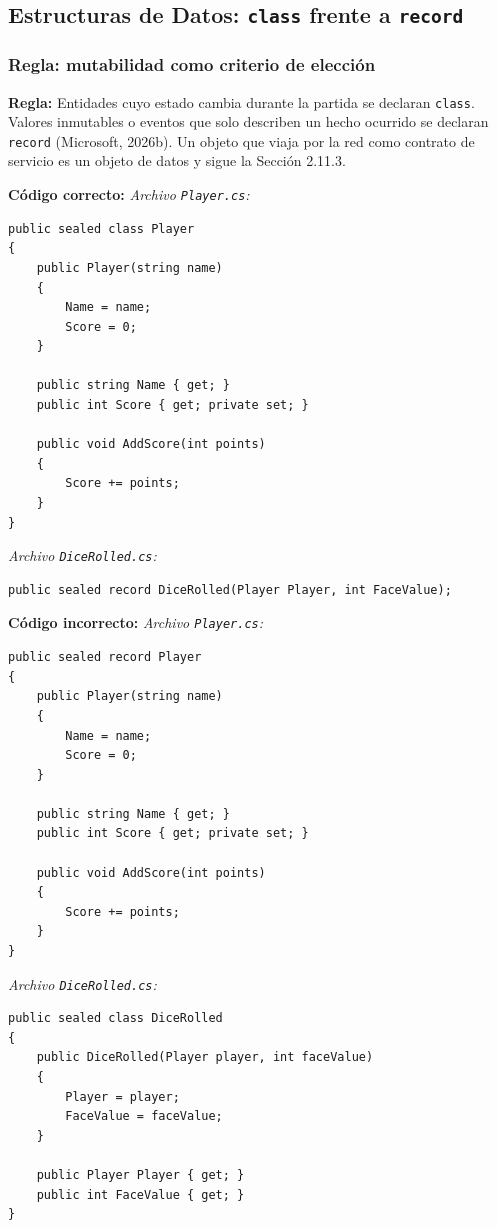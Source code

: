 \subsection{Estructuras de Datos: \texttt{class} frente a \texttt{record}}

\subsubsection{Regla: mutabilidad como criterio de elección}

\textbf{Regla:} Entidades cuyo estado cambia durante la partida se declaran \texttt{class}. Valores inmutables o eventos que solo describen un hecho ocurrido se declaran \texttt{record} (Microsoft, 2026b). Un objeto que viaja por la red como contrato de servicio es un objeto de datos y sigue la Sección 2.11.3.

\textbf{Código correcto:}
\textit{Archivo \texttt{Player.cs}:}
\begin{lstlisting}[style=csharpstyle]
public sealed class Player
{
    public Player(string name)
    {
        Name = name;
        Score = 0;
    }

    public string Name { get; }
    public int Score { get; private set; }

    public void AddScore(int points)
    {
        Score += points;
    }
}
\end{lstlisting}

\textit{Archivo \texttt{DiceRolled.cs}:}
\begin{lstlisting}[style=csharpstyle]
public sealed record DiceRolled(Player Player, int FaceValue);
\end{lstlisting}

\textbf{Código incorrecto:}
\textit{Archivo \texttt{Player.cs}:}
\begin{lstlisting}[style=csharpstyle]
public sealed record Player
{
    public Player(string name)
    {
        Name = name;
        Score = 0;
    }

    public string Name { get; }
    public int Score { get; private set; }

    public void AddScore(int points)
    {
        Score += points;
    }
}
\end{lstlisting}

\textit{Archivo \texttt{DiceRolled.cs}:}
\begin{lstlisting}[style=csharpstyle]
public sealed class DiceRolled
{
    public DiceRolled(Player player, int faceValue)
    {
        Player = player;
        FaceValue = faceValue;
    }

    public Player Player { get; }
    public int FaceValue { get; }
}
\end{lstlisting}

